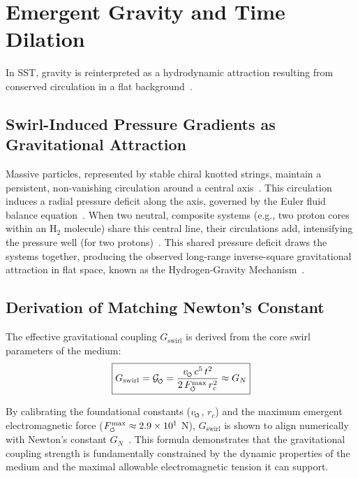 \documentclass[10pt,reprint,aps,onecolumn,nofootinbib]{revtex4-2}
\newcommand{\Fmaxswirl}{F^{\max}_{\mkern-1mu\scriptscriptstyle\boldsymbol{\circlearrowleft}}}
\begin{document}
\section{Emergent Gravity and Time Dilation}
\label{sec:gravity}
In SST, gravity is reinterpreted as a hydrodynamic attraction resulting from conserved circulation in a flat background~\cite{3}.

\subsection*{Swirl-Induced Pressure Gradients as Gravitational Attraction}
Massive particles, represented by stable chiral knotted strings, maintain a persistent, non-vanishing circulation around a central axis~\cite{3}. This circulation induces a radial pressure deficit along the axis, governed by the Euler fluid balance equation~\cite{1}. When two neutral, composite systems (e.g., two proton cores within an H$_2$ molecule) share this central line, their circulations add, intensifying the pressure well (for two protons)~\cite{3}. This shared pressure deficit draws the systems together, producing the observed long-range inverse-square gravitational attraction in flat space, known as the Hydrogen-Gravity Mechanism~\cite{3}.

\subsection*{Derivation of Matching Newton's Constant}
The effective gravitational coupling $G_\text{swirl}$ is derived from the core swirl parameters of the medium:
        \begin{equation}
        \boxed{
            G_{\text{swirl}}
            = \mathcal{G}_{\mkern-2mu\scriptscriptstyle\boldsymbol{\circlearrowleft}}
            = \frac{v_{\mkern-2mu\scriptscriptstyle\boldsymbol{\circlearrowleft}} \, c^5 \, t^2}{2 \, \Fmaxswirl \, r_c^2}
            \approx G_N
        }\label{eq:gswirl}
        \end{equation}

By calibrating the foundational constants ($v_{\mkern-2mu\scriptscriptstyle\boldsymbol{\circlearrowleft}}$, $r_c$) and the maximum emergent electromagnetic force ($\Fmaxswirl \approx 2.9 \times 10^1$ N), $G_\text{swirl}$ is shown to align numerically with Newton's constant $G_N$~\cite{1}. This formula demonstrates that the gravitational coupling strength is fundamentally constrained by the dynamic properties of the medium and the maximal allowable electromagnetic tension it can support.
\end{document}
